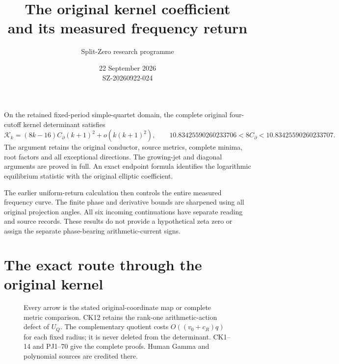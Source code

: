 \documentclass[10pt]{article}
\title{The original kernel coefficient\\and its measured frequency return}
\author{Split-Zero research programme}
\date{22 September 2026\\SZ-20260922-024}
\begin{document}
\maketitle
On the retained fixed-period simple-quartet domain, the complete original
four-cutoff kernel determinant satisfies
\[
 \mathcal K_k=(8k-16)C_\partial(k+1)^2+o(k(k+1)^2),\qquad
 10.83425590260233706<8C_\partial<10.83425590260233707.
\]
The argument retains the original conductor, source metrics, complete minima,
root factors and all exceptional directions. The growing-jet and diagonal
arguments are proved in full. An exact endpoint formula identifies the
logarithmic equilibrium statistic with the original elliptic coefficient.

The earlier uniform-return calculation then controls the entire measured
frequency curve. The finite phase and derivative bounds are sharpened using
all original projection angles. All six incoming continuations have separate
reading and source records. These results do not provide a hypothetical zeta
zero or assign the separate phase-bearing arithmetic-current signs.
\begingroup\small\tableofcontents\endgroup\clearpage
\section*{The exact route through the original kernel}
\begin{figure}[H]\centering
{}
\caption{Every arrow is the stated original-coordinate map or complete metric
comparison. CK12 retains the rank-one arithmetic-action defect of $U_Q$.
The complementary quotient costs $O((v_0+c_R)q)$ for each fixed radius;
it is never deleted from the determinant. CK1--14 and PJ1--70 give the
complete proofs. Human Gamma and polynomial sources are credited there.}
\end{figure}\clearpage
\end{document}
